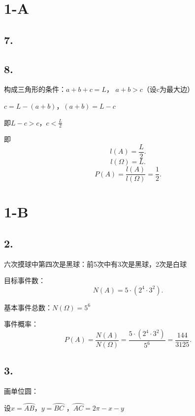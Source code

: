 \def\lecturer{李漫漫}
\def\noter{THF}
\def\className{className}
\def\term{term}



\maketitle
\tableofcontents
\section*{1-A}%
\label{sec:1-A}
\subsection*{7.}%
\label{sub:7.}



\subsection*{8.}%
\label{sub:8.}
构成三角形的条件：$a+b+c=L$， $a+b>c$（设c为最大边）
 
$c=L-\left( a+b \right)$，$\left( a+b \right) =L-c$

即$L-c>c$，$c<\frac{L}{2}$

即\[
    l\left( A \right) =\frac{L}{2}
.\]
\[
    l\left( \Omega \right) =L
.\] 
\[
    P\left( A \right) =\frac{l\left( A \right) }{l\left( \Omega \right) }=\frac{1}{2}
.\] 
\section*{1-B}%
\label{sec:1-B}
\subsection*{2.}%
\label{sub:2.}
六次摸球中第四次是黑球：前5次中有3次是黑球，2次是白球

目标事件数：\[
    N\left( A \right) =5\cdot \left( 2^4\cdot 3^2 \right) 
.\]

基本事件总数：$N\left( \Omega \right) =5^6$

事件概率：\[
    P\left( A \right) =\frac{N\left( A \right) }{N\left( \Omega \right) }=\frac{5\cdot \left( 2^4\cdot 3^2 \right) }{5^6} = \frac{144}{3125}
.\] 
\subsection*{3.}%
\label{sub:3.}
画单位圆：
\begin{center}
\end{center}
设$x=\wideparen{AB}$，$y=\wideparen{BC}$ ，$\wideparen{AC}=2\pi-x-y$

